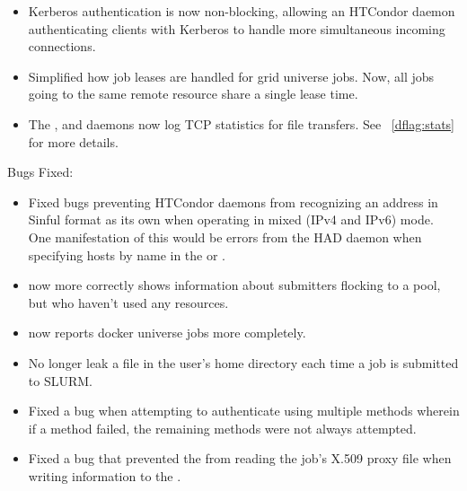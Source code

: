 \begin{itemize}
\item Kerberos authentication is now non-blocking, allowing an HTCondor
daemon authenticating clients with Kerberos to handle more simultaneous
incoming connections.

\item Simplified how job leases are handled for grid universe jobs.
Now, all jobs going to the same remote resource share a single lease
time.

\item The ,  and  daemons
now log TCP statistics for file transfers.  See ~\ref{dflag:stats} for
more details.

\end{itemize}

\noindent Bugs Fixed:

\begin{itemize}

\item Fixed bugs preventing HTCondor daemons from recognizing an address in
Sinful format as its own when operating in mixed (IPv4 and IPv6) mode.  One
manifestation of this would be errors from the HAD daemon when specifying
hosts by name in the  or .

\item {} now more correctly shows information
about submitters flocking to a pool, but who haven't used 
any resources.

\item {} now reports docker universe jobs more completely.

\item No longer leak a file in the user's home directory each time a
job is submitted to SLURM.

\item Fixed a bug when attempting to authenticate using multiple
methods wherein if a method failed, the remaining methods were not
always attempted.

\item Fixed a bug that prevented the  from reading the
job's X.509 proxy file when writing information to the
.

\end{itemize}

